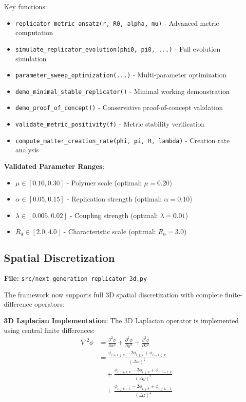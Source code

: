 \documentclass[11pt]{article}
\begin{document}
Key functions:
\begin{itemize}
\item \texttt{replicator\_metric\_ansatz(r, R0, alpha, mu)} - Advanced metric computation
\item \texttt{simulate\_replicator\_evolution(phi0, pi0, ...)} - Full evolution simulation
\item \texttt{parameter\_sweep\_optimization(...)} - Multi-parameter optimization
\item \texttt{demo\_minimal\_stable\_replicator()} - Minimal working demonstration  
\item \texttt{demo\_proof\_of\_concept()} - Conservative proof-of-concept validation
\item \texttt{validate\_metric\_positivity(f)} - Metric stability verification
\item \texttt{compute\_matter\_creation\_rate(phi, pi, R, lambda)} - Creation rate analysis
\end{itemize}

\textbf{Validated Parameter Ranges}:
\begin{itemize}
\item $\mu \in [0.10, 0.30]$ - Polymer scale (optimal: $\mu = 0.20$)
\item $\alpha \in [0.05, 0.15]$ - Replication strength (optimal: $\alpha = 0.10$)  
\item $\lambda \in [0.005, 0.02]$ - Coupling strength (optimal: $\lambda = 0.01$)
\item $R_0 \in [2.0, 4.0]$ - Characteristic scale (optimal: $R_0 = 3.0$)
\end{itemize}

\subsection{Spatial Discretization}

\textbf{File:} \texttt{src/next\_generation\_replicator\_3d.py}

The framework now supports full 3D spatial discretization with complete finite-difference operators:

\textbf{3D Laplacian Implementation}:
The 3D Laplacian operator is implemented using central finite differences:
\begin{align}
\nabla^2\phi &= \frac{\partial^2\phi}{\partial x^2} + \frac{\partial^2\phi}{\partial y^2} + \frac{\partial^2\phi}{\partial z^2} \\
&= \frac{\phi_{i+1,j,k} - 2\phi_{i,j,k} + \phi_{i-1,j,k}}{(\Delta x)^2} \\
&\quad + \frac{\phi_{i,j+1,k} - 2\phi_{i,j,k} + \phi_{i,j-1,k}}{(\Delta y)^2} \\
&\quad + \frac{\phi_{i,j,k+1} - 2\phi_{i,j,k} + \phi_{i,j,k-1}}{(\Delta z)^2}
\end{align}
\end{document}
